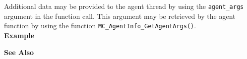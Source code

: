 Additional data may be provided to the agent thread by using the
\texttt{agent\_args} argument in the function call. This argument may be
retrieved by the agent function by using the function
\texttt{MC\_AgentInfo\_GetAgentArgs()}. \\

\noindent
{\bf Example}\\
\noindent
{\footnotesize}

\noindent
{\bf See Also}\\

